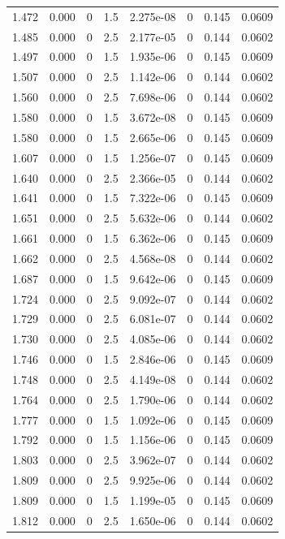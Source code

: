\documentclass[preview]{standalone}
\begin{document}
{{{\begin{tabular}{L{1.2cm}C{1.2cm} C{0.3cm}C{0.5cm} C{1.4cm}C{1.4cm} C{1.4cm}C{1.4cm}}
  1.472  &  0.000  & 0     & 1.5 &  2.275e-08  & 0  & 0.145 &  0.0609   \\ 
  1.485  &  0.000  & 0     & 2.5 &  2.177e-05  & 0  & 0.144 &  0.0602   \\ 
  1.497  &  0.000  & 0     & 1.5 &  1.935e-06  & 0  & 0.145 &  0.0609   \\ 
  1.507  &  0.000  & 0     & 2.5 &  1.142e-06  & 0  & 0.144 &  0.0602   \\ 
  1.560  &  0.000  & 0     & 2.5 &  7.698e-06  & 0  & 0.144 &  0.0602   \\ 
  1.580  &  0.000  & 0     & 1.5 &  3.672e-08  & 0  & 0.145 &  0.0609   \\ 
  1.580  &  0.000  & 0     & 1.5 &  2.665e-06  & 0  & 0.145 &  0.0609   \\ 
  1.607  &  0.000  & 0     & 1.5 &  1.256e-07  & 0  & 0.145 &  0.0609   \\ 
  1.640  &  0.000  & 0     & 2.5 &  2.366e-05  & 0  & 0.144 &  0.0602   \\ 
  1.641  &  0.000  & 0     & 1.5 &  7.322e-06  & 0  & 0.145 &  0.0609   \\ 
  1.651  &  0.000  & 0     & 2.5 &  5.632e-06  & 0  & 0.144 &  0.0602   \\ 
  1.661  &  0.000  & 0     & 1.5 &  6.362e-06  & 0  & 0.145 &  0.0609   \\ 
  1.662  &  0.000  & 0     & 2.5 &  4.568e-08  & 0  & 0.144 &  0.0602   \\ 
  1.687  &  0.000  & 0     & 1.5 &  9.642e-06  & 0  & 0.145 &  0.0609   \\ 
  1.724  &  0.000  & 0     & 2.5 &  9.092e-07  & 0  & 0.144 &  0.0602   \\ 
  1.729  &  0.000  & 0     & 2.5 &  6.081e-07  & 0  & 0.144 &  0.0602   \\ 
  1.730  &  0.000  & 0     & 2.5 &  4.085e-06  & 0  & 0.144 &  0.0602   \\ 
  1.746  &  0.000  & 0     & 1.5 &  2.846e-06  & 0  & 0.145 &  0.0609   \\ 
  1.748  &  0.000  & 0     & 2.5 &  4.149e-08  & 0  & 0.144 &  0.0602   \\ 
  1.764  &  0.000  & 0     & 2.5 &  1.790e-06  & 0  & 0.144 &  0.0602   \\ 
  1.777  &  0.000  & 0     & 1.5 &  1.092e-06  & 0  & 0.145 &  0.0609   \\ 
  1.792  &  0.000  & 0     & 1.5 &  1.156e-06  & 0  & 0.145 &  0.0609   \\ 
  1.803  &  0.000  & 0     & 2.5 &  3.962e-07  & 0  & 0.144 &  0.0602   \\ 
  1.809  &  0.000  & 0     & 2.5 &  9.925e-06  & 0  & 0.144 &  0.0602   \\ 
  1.809  &  0.000  & 0     & 1.5 &  1.199e-05  & 0  & 0.145 &  0.0609   \\ 
  1.812  &  0.000  & 0     & 2.5 &  1.650e-06  & 0  & 0.144 &  0.0602   \\ 
\hline 
\end{tabular} 

}}}
\end{document}
